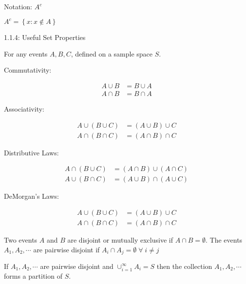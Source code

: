 Notation: $A^c$

$A^c = \left\{ x: x \notin A \right\}$


\begin{theorem}
	1.1.4: Useful Set Properties

	For any events $A, B, C$, defined on a sample space $S$.

	Commutativity:

	\begin{align*}
		A \cup B &= B \cup A\\
		A \cap B &= B \cap A
	\end{align*}

	Associativity:

	\begin{align*}
		A \cup (B \cup C) &= (A \cup B) \cup C \\
		A \cap (B \cap C) &= (A \cap B) \cap C
	\end{align*}

	Distributive Laws:

	\begin{align*}
		A \cap (B \cup C) &= (A \cap B) \cup (A \cap C) \\
		A \cup (B \cap C) &= (A \cup B) \cap (A \cup C)
	\end{align*}

	DeMorgan's Laws:

	\begin{align*}
		A \cup (B \cup C) &= (A \cup B) \cup C \\
		A \cap (B \cap C) &= (A \cap B) \cap C
	\end{align*}

\end{theorem}

\begin{definition}
	Two events $A$ and $B$ are disjoint or mutually exclusive if $A \cap B = \emptyset$. The events $A_1, A_2, \cdots$ are pairwise disjoint if $A_i \cap A_j = \emptyset \; \forall \; i \neq j$
	
\end{definition}

\begin{definition}[Partition]
	If $A_1, A_2, \cdots$ are pairwise disjoint and $\cup_{i=1}^{\infty} A_i = S$ then the collection $A_1, A_2, \cdots$ forms a partition of $S$.
\end{definition}
